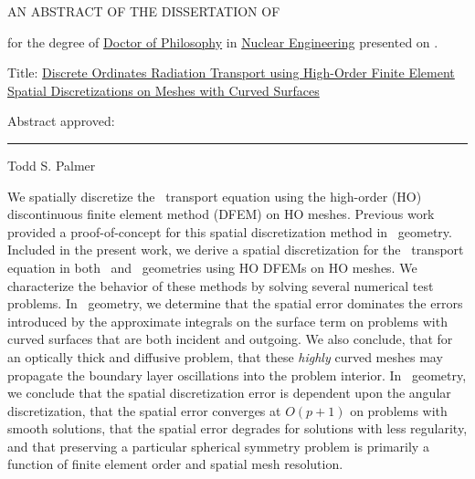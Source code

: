 \documentclass[12pt]{article}
\begin{document}
\begin{singlespace}

\begin{center}
AN ABSTRACT OF THE DISSERTATION OF
\end{center}

\vspace{12pt}

\noindent
\uline{\ThesisAuthor} for the degree of \uline{Doctor of Philosophy} in \uline{Nuclear Engineering} presented on \uline{\DefenseDate}.

\vspace{12pt}

\noindent
Title: \uline{Discrete Ordinates Radiation Transport using High-Order Finite Element Spatial Discretizations on Meshes with Curved Surfaces}

\vspace{12pt}

\noindent
Abstract approved:

\vspace{12pt}

\noindent
\begin{center}
\rule{\textwidth}{0.4pt}

\noindent
Todd S. Palmer
\end{center}

\vspace{12pt}

\end{singlespace}

We spatially discretize the \SN\ transport equation using the high-order (HO) discontinuous finite element method (DFEM) on HO meshes. Previous work provided a proof-of-concept for this spatial discretization method in \XY\ geometry. Included in the present work, we derive a spatial discretization for the \SN\ transport equation in both \XY\ and \RZ\ geometries using HO DFEMs on HO meshes. We characterize the behavior of these methods by solving several numerical test problems. In \XY\ geometry, we determine that the spatial error dominates the errors introduced by the approximate integrals on the surface term on problems with curved surfaces that are both incident and outgoing. We also conclude, that for an optically thick and diffusive problem, that these \emph{highly} curved meshes may propagate the boundary layer oscillations into the problem interior. In \RZ\ geometry, we conclude that the spatial discretization error is dependent upon the angular discretization, that the spatial error converges at $O(p+1)$ on problems with smooth solutions, that the spatial error degrades for solutions with less regularity, and that preserving a particular spherical symmetry problem is primarily a function of finite element order and spatial mesh resolution.
\end{document}
